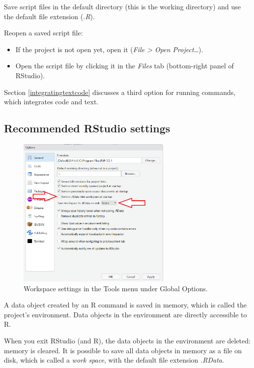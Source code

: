\documentclass[doc,floatsintext]{apa6}
\providecommand{\tightlist}{%
  \setlength{\itemsep}{0pt}\setlength{\parskip}{0pt}}
\begin{document}
Save script files in the default directory (this is the working
directory) and use the default file extension (\emph{.R}).

Reopen a saved script file:

\begin{itemize}
\tightlist
\item
  If the project is not open yet, open it (\emph{File \textgreater{}
  Open Project\ldots{}}).
\item
  Open the script file by clicking it in the \emph{Files} tab
  (bottom-right panel of RStudio).
\end{itemize}

Section \ref{integratingtextcode} discusses a third option for running
commands, which integrates code and text.

\subsection{Recommended RStudio settings}\label{rsettings}

\begin{figure}
\includegraphics[width=2.96in]{Settings} \caption{Workspace settings in the Tools menu under Global Options.}\label{fig:RStudiosettings}
\end{figure}

A data object created by an R command is saved in memory, which is
called the project's environment. Data objects in the environment are
directly accessible to R.

When you exit RStudio (and R), the data objects in the environment are
deleted: memory is cleared. It is possible to save all data objects in
memory as a file on disk, which is called a \emph{work space}, with the
default file extension \emph{.RData}.
\end{document}

